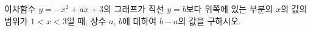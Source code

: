 이차함수 $y=-x^2+ax+3$의 그래프가 직선 $y=b$보다 위쪽에 있는 부분의 $x$의 값의 범위가 $1<x<3$일 때, 상수 $a$, $b$에 대하여 $b-a$의 값을 구하시오.

